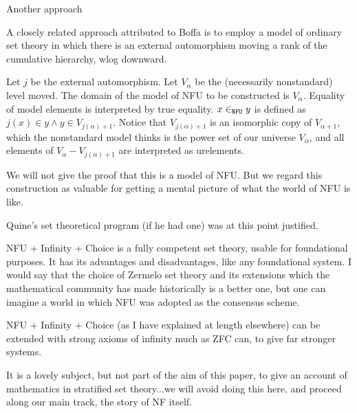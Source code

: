 \documentclass{slides}
\begin{document}
\begin{slide}

Another approach

A closely related approach attributed to Boffa is to employ a model of ordinary set theory in which there is an external automorphism moving a rank of the cumulative hierarchy, wlog downward.

Let $j$ be the external automorphism.  Let $V_\alpha$ be the (necessarily nonstandard) level moved.    The domain of the model of NFU to be constructed is $V_\alpha$.  Equality of model elements is interpreted by true equality.  $x \in _{\tt NFU} y$ is defined as $j(x) \in y \wedge y \in V_{j(\alpha)+1}$.  Notice that $V_{j(\alpha)+1}$ is an isomorphic copy of $V_{\alpha+1}$, which the nonstandard model thinks is the power set of our universe $V_{\alpha}$, and all elements of $V_{\alpha}-V_{j(\alpha)+1}$ are interpreted as urelements.

We will not give the proof that this is a model of NFU.  But we regard this construction as valuable for getting a mental picture of what the world of NFU is like.

\end{slide}

\begin{slide}

Quine's set theoretical program (if he had one) was at this point justified.

NFU + Infinity + Choice is a fully competent set theory, usable for foundational purposes.  It has its advantages and disadvantages, like any foundational system.  I would say that the choice of Zermelo set theory and its extensions which the mathematical community has made historically is a better one, but one can imagine a world in which NFU was adopted as the consensus scheme.

NFU + Infinity + Choice (as I have explained at length elsewhere) can be extended with strong axioms of infinity much as ZFC can, to give far stronger systems.

It is a lovely subject, but not part of the aim of this paper, to give an account of mathematics in stratified set theory...we will avoid doing this here, and proceed along our main track, the story of NF itself.


\end{slide}
\end{document}
